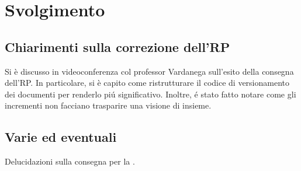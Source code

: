 \newpage
\section*{Svolgimento}

	\subsection*{Chiarimenti sulla correzione dell'RP}
		Si è discusso in videoconferenza col professor Vardanega sull'esito della consegna dell'RP. In particolare, si è capito come ristrutturare il codice di versionamento dei documenti per  renderlo piú significativo.
		Inoltre, é stato fatto notare come gli incrementi non facciano trasparire una visione di insieme.

	\subsection*{Varie ed eventuali}
		Delucidazioni sulla consegna per la .
